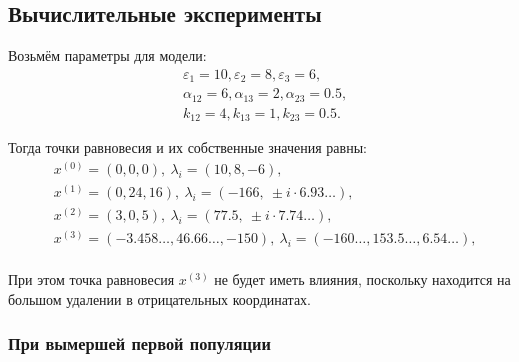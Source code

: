 \subsection{Вычислительные эксперименты}
    Возьмём параметры для модели:
    \[
        \begin{split}
            & \varepsilon_1 = 10, \varepsilon_2 = 8, \varepsilon_3 = 6, \\
            & \alpha_{12} = 6, \alpha_{13} = 2, \alpha_{23} = 0.5, \\
            & k_{12} = 4, k_{13} = 1, k_{23} = 0.5.
        \end{split}
    \]
    
    Тогда точки равновесия и их собственные значения равны:
    \[
        \begin{split}
            & x^{(0)} = (0,0,0), ~ \lambda_i = (10, 8, -6), \\
            & x^{(1)} = (0,24,16), ~ \lambda_i = (-166, ~ \pm i \cdot 6.93\dots), \\
            & x^{(2)} = (3,0,5), ~ \lambda_i = (77.5, ~ \pm i \cdot 7.74\dots), \\
            & x^{(3)} = (-3.458\dots, 46.66\dots, -150), ~ \lambda_i = (-160\dots, 153.5\dots, 6.54\dots), \\
        \end{split}
    \]

    При этом точка равновесия \( x^{(3)} \) не будет иметь влияния, поскольку находится на большом удалении в отрицательных координатах.

    \subsubsection{При вымершей первой популяции}

